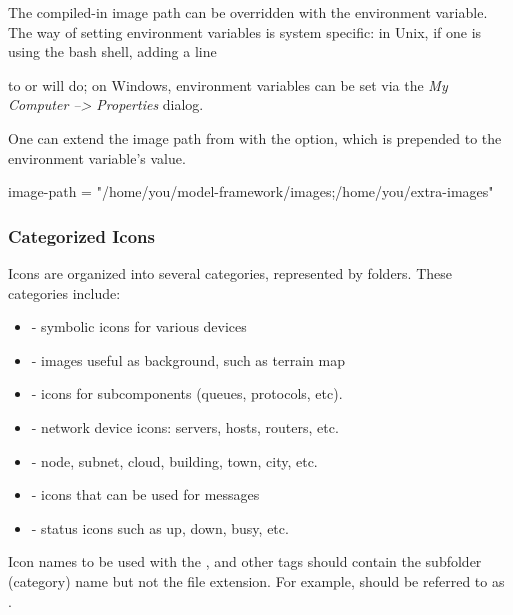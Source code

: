 The compiled-in image path can be overridden with the 
environment variable. The way of setting environment variables is system
specific: in Unix, if one is using the bash shell, adding a line


to  or  will do;
on Windows, environment variables can be set via the \textit{My Computer --> Properties} dialog.

One can extend the image path from  with the
 option, which is prepended to the environment
variable's value.

\begin{inifile}
[General]
image-path = "/home/you/model-framework/images;/home/you/extra-images"
\end{inifile}


\subsubsection{Categorized Icons}
\label{sec:graphics:categorized-icons}

Icons are organized into several categories, represented by folders.
These categories include:

\begin{itemize}
  \item {} - symbolic icons for various devices
  \item {} - images useful as background, such as terrain map
  \item {} - icons for subcomponents (queues, protocols, etc).
  \item {} - network device icons: servers, hosts, routers, etc.
  \item {} - node, subnet, cloud, building, town, city, etc.
  \item {} - icons that can be used for messages
  \item {} - status icons such as up, down, busy, etc.
\end{itemize}

Icon names to be used with the ,  and other tags should
contain the subfolder (category) name but not the file extension. For
example,  should be referred to as
.


